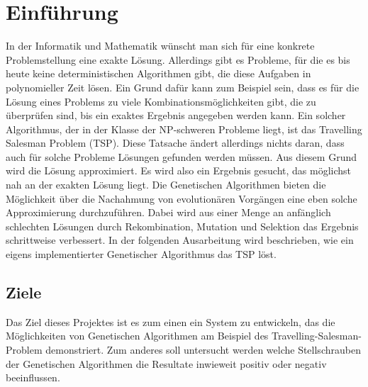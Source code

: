 
\section{Einführung}
In der Informatik und Mathematik wünscht man sich für eine konkrete Problemstellung eine exakte Lösung. Allerdings gibt es Probleme, für die es bis heute keine deterministischen Algorithmen gibt, die diese Aufgaben in polynomieller Zeit lösen. 
Ein Grund dafür kann zum Beispiel sein, dass es für die Lösung eines Problems zu viele Kombinationsmöglichkeiten gibt, die zu überprüfen sind, bis ein exaktes Ergebnis angegeben werden kann. Ein solcher Algorithmus, der in der Klasse der NP-schweren Probleme liegt, ist das Travelling Salesman Problem (TSP).
Diese Tatsache ändert allerdings nichts daran, dass auch für solche Probleme Lösungen gefunden werden müssen. Aus diesem Grund wird die Lösung approximiert. Es wird also ein Ergebnis gesucht, das möglichst nah an der exakten Lösung liegt. 
Die Genetischen Algorithmen bieten die Möglichkeit über die Nachahmung von evolutionären Vorgängen eine eben solche Approximierung durchzuführen.
Dabei wird aus einer Menge an anfänglich schlechten Lösungen durch Rekombination, Mutation und Selektion das Ergebnis schrittweise verbessert. In der folgenden Ausarbeitung wird beschrieben, wie ein eigens implementierter Genetischer Algorithmus das TSP löst.

\subsection{Ziele}
Das Ziel dieses Projektes ist es zum einen ein System zu entwickeln, das die Möglichkeiten von Genetischen Algorithmen am Beispiel des Travelling-Salesman-Problem demonstriert.
Zum anderes soll untersucht werden welche Stellschrauben der Genetischen Algorithmen die Resultate inwieweit positiv oder negativ beeinflussen.

